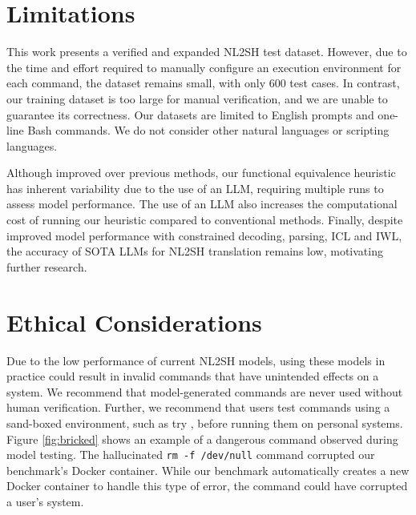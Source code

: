 \documentclass[11pt]{article}
\begin{document}
\section{Limitations}
\label{sec:limitations}
This work presents a verified and expanded NL2SH test dataset. However, due to the time and effort required to manually configure an execution environment for each command, the dataset remains small, with only 600 test cases. In contrast, our training dataset is too large for manual verification, and we are unable to guarantee its correctness. Our datasets are limited to English prompts and one-line Bash commands. We do not consider other natural languages or scripting languages.

Although improved over previous methods, our functional equivalence heuristic has inherent variability due to the use of an LLM, requiring multiple runs to assess model performance. The use of an LLM also increases the computational cost of running our heuristic compared to conventional methods. Finally, despite improved model performance with constrained decoding, parsing, ICL and IWL, the accuracy of SOTA LLMs for NL2SH translation remains low, motivating further research.


\section{Ethical Considerations}
\label{sec:ethics}
Due to the low performance of current NL2SH models, using these models in practice could result in invalid commands that have unintended effects on a system. We recommend that model-generated commands are never used without human verification. Further, we recommend that users test commands using a sand-boxed environment, such as try \cite{try}, before running them on personal systems. Figure \ref{fig:bricked} shows an example of a dangerous command observed during model testing. The hallucinated \texttt{rm -f /dev/null} command corrupted our benchmark's Docker container. While our benchmark automatically creates a new Docker container to handle this type of error, the command could have corrupted a user's system.
\end{document}
